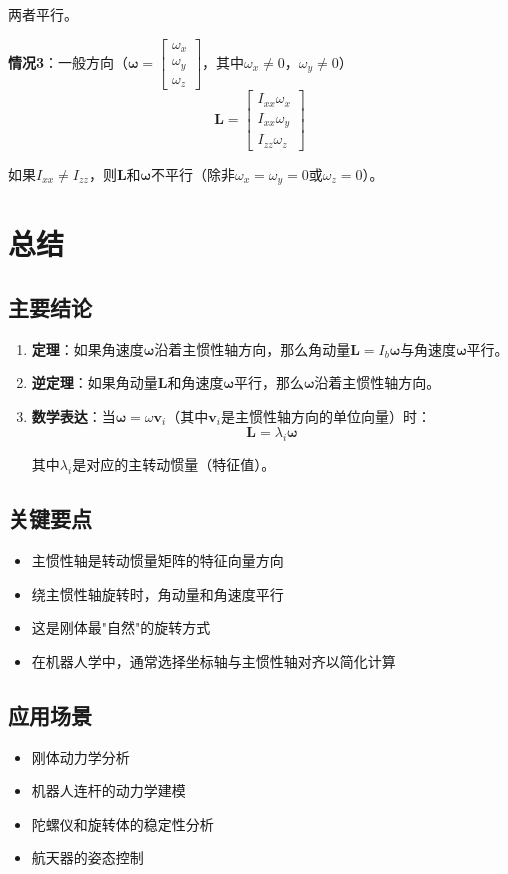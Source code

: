 \documentclass[12pt,a4paper]{article}
\begin{document}
两者平行。

\textbf{情况3}：一般方向（$\bm{\omega} = \begin{bmatrix} \omega_x \\ \omega_y \\ \omega_z \end{bmatrix}$，其中$\omega_x \neq 0$，$\omega_y \neq 0$）
\begin{equation}
\bm{L} = \begin{bmatrix}
I_{xx} \omega_x \\
I_{xx} \omega_y \\
I_{zz} \omega_z
\end{bmatrix}
\end{equation}

如果$I_{xx} \neq I_{zz}$，则$\bm{L}$和$\bm{\omega}$不平行（除非$\omega_x = \omega_y = 0$或$\omega_z = 0$）。

\section{总结}

\subsection{主要结论}

\begin{enumerate}
\item \textbf{定理}：如果角速度$\bm{\omega}$沿着主惯性轴方向，那么角动量$\bm{L} = I_b \bm{\omega}$与角速度$\bm{\omega}$平行。

\item \textbf{逆定理}：如果角动量$\bm{L}$和角速度$\bm{\omega}$平行，那么$\bm{\omega}$沿着主惯性轴方向。

\item \textbf{数学表达}：当$\bm{\omega} = \omega \bm{v}_i$（其中$\bm{v}_i$是主惯性轴方向的单位向量）时：
\begin{equation}
\bm{L} = \lambda_i \bm{\omega}
\end{equation}

其中$\lambda_i$是对应的主转动惯量（特征值）。
\end{enumerate}

\subsection{关键要点}

\begin{itemize}
\item 主惯性轴是转动惯量矩阵的特征向量方向
\item 绕主惯性轴旋转时，角动量和角速度平行
\item 这是刚体最"自然"的旋转方式
\item 在机器人学中，通常选择坐标轴与主惯性轴对齐以简化计算
\end{itemize}

\subsection{应用场景}

\begin{itemize}
\item 刚体动力学分析
\item 机器人连杆的动力学建模
\item 陀螺仪和旋转体的稳定性分析
\item 航天器的姿态控制
\end{itemize}
\end{document}
